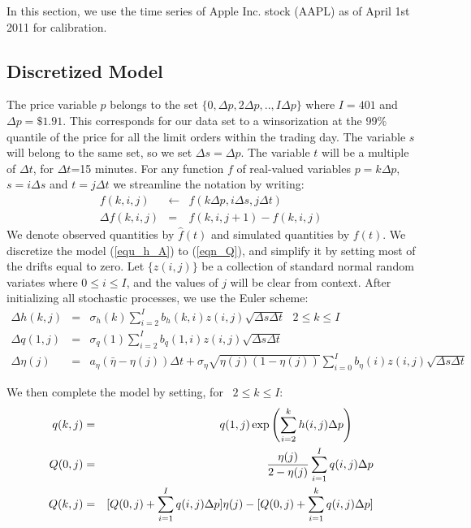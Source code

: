 \documentclass{article}
\begin{document}
In this section, we use the time series of Apple Inc. stock (AAPL) as of
April 1st 2011 for calibration.

\bigskip

\subsection{Discretized Model}

The price variable $p$ belongs to the set $\{0,\Delta p,2\Delta p,..,I\Delta
p\}$ where $I=401$ and $\Delta p=\$1.91$. This corresponds for our data set
to a winsorization at the 99\% quantile of the price for all the limit
orders within the trading day. The variable $s$ will belong to the same set,
so we set $\Delta s=\Delta p$. The variable $t$ will be a multiple of $%
\Delta t$, for $\Delta t$=15 minutes. For any function $f$ of real-valued
variables $p=k\Delta p,$ $s=i\Delta s$ and $t=j\Delta t$ we streamline the
notation by writing:
\begin{eqnarray*}
f(k,i,j) &\leftarrow &f(k\Delta p,i\Delta s,j\Delta t) \\
\Delta f(k,i,j) &=&f(k,i,j+1)-f(k,i,j)
\end{eqnarray*}
We denote observed quantities by $\hat{f}(t)$ and simulated quantities by $%
f(t)$. We discretize the model (\ref{equ_h_A}) to (\ref{eqn_Q}), and
simplify it by setting most of the drifts equal to zero. Let $\{z(i,j)\}$ be
a collection of standard normal random variates where $0\leq i\leq I$, and
the values of $j$ will be clear from context. After initializing all
stochastic processes, we use the Euler scheme:%
\begin{eqnarray}
\Delta h(k,j) &=&\sigma _{h}(k)\sum_{i=2}^{I}b_{h}(k,i)z(i,j)\sqrt{\Delta
s\Delta t}\text{ \ \ \ }2\leq k\leq I  \label{Euler_1} \\
\Delta q(1,j) &=&\sigma _{q}(1)\sum_{i=2}^{I}b_{q}(1,i)z(i,j)\sqrt{\Delta
s\Delta t}  \label{Euler_2} \\
\Delta \eta (j) &=&a_{\eta }(\bar{\eta}-\eta (j))\Delta t+\sigma _{\eta }%
\sqrt{\eta (j)(1-\eta (j))}\sum_{i=0}^{I}b_{\eta }(i)z(i,j)\sqrt{\Delta
s\Delta t}  \label{Euler_3}
\end{eqnarray}

We then complete the model by setting, for \ $2\leq k\leq I$:%
\begin{eqnarray*}
q(k,j) &=&q(1,j)\exp \left( {\sum_{i=2}^{k}h(i,j)\Delta p}\right) \text{ \ \
} \\
Q(0,j) &=&\frac{\eta (j)}{2-\eta (j)}\sum_{i=1}^{I}q(i,j){\Delta p} \\
Q(k,j) &=&[Q(0,j)+\sum_{i=1}^{I}q(i,j)\Delta p]\eta
(j)-[Q(0,j)+\sum_{i=1}^{k}q(i,j)\Delta p]
\end{eqnarray*}
\end{document}

